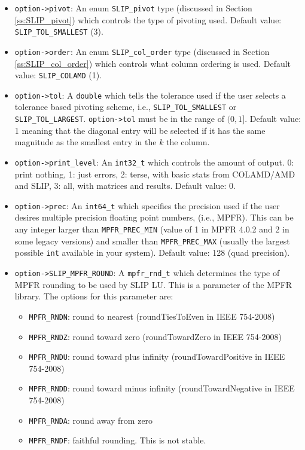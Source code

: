 \documentclass[11pt]{article}
\theoremstyle{definition}
\begin{document}
\begin{itemize}
\item
\verb|option->pivot|: An enum \verb|SLIP_pivot| type (discussed in Section
\ref{ss:SLIP_pivot}) which controls the type of pivoting used. Default value:
\verb|SLIP_TOL_SMALLEST| (3).

\item
\verb|option->order|: An enum \verb|SLIP_col_order| type (discussed in Section
\ref{ss:SLIP_col_order}) which controls what column ordering is used. Default
value: \verb|SLIP_COLAMD| (1).

\item
\verb|option->tol|: A \verb|double| which tells the tolerance used if the user
selects a tolerance based pivoting scheme, i.e., \verb|SLIP_TOL_SMALLEST| or
\verb|SLIP_TOL_LARGEST|. \verb|option->tol| must be in the range of $(0,1]$.
Default value: 1 meaning that the diagonal entry will be selected if it has the
same magnitude as the smallest entry in the $k$ the column.

\item
\verb|option->print_level|: An \verb|int32_t| which controls the amount of
output. 0: print nothing, 1: just errors, 2: terse, with basic stats from
COLAMD/AMD and SLIP, 3: all, with matrices and results. Default value: 0.

\item
\verb|option->prec|: An \verb|int64_t| which specifies the precision used if
the user desires multiple precision floating point numbers, (i.e., MPFR). This
can be any integer larger than \verb|MPFR_PREC_MIN| (value of 1 in MPFR 4.0.2
and 2 in some legacy versions) and smaller than \verb|MPFR_PREC_MAX| (usually
the largest possible \verb'int' available in your system). Default value: 128
(quad precision).

\item
\verb|option->SLIP_MPFR_ROUND|: A \verb|mpfr_rnd_t| which determines the type
of MPFR rounding to be used by SLIP LU. This is a parameter of the MPFR
library. The options for this parameter are:

    \begin{itemize}
        \item \verb|MPFR_RNDN|: round to nearest
            (roundTiesToEven in IEEE 754-2008)
        \item \verb|MPFR_RNDZ|: round toward zero
            (roundTowardZero in IEEE 754-2008)
        \item \verb|MPFR_RNDU|: round toward plus infinity
            (roundTowardPositive in IEEE 754-2008)
        \item \verb|MPFR_RNDD|: round toward minus infinity
            (roundTowardNegative in IEEE 754-2008)
        \item \verb|MPFR_RNDA|: round away from zero
        \item \verb|MPFR_RNDF|: faithful rounding. This is not stable.
    \end{itemize}


\end{itemize}
\end{document}
